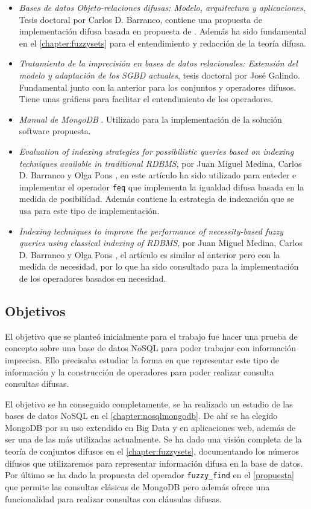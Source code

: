 \begin{itemize}
    \item \textit{Bases de datos Objeto-relaciones difusas: Modelo, arquitectura y aplicaciones}, Tesis doctoral por Carlos D. Barranco, contiene una propuesta de implementación difusa basada en propuesta de \cite{tesismedina}. Además ha sido fundamental en el \autoref{chapter:fuzzysets} para el entendimiento y redacción de la teoría difusa.
    \item \textit{Tratamiento de la imprecisión en bases de datos relacionales: Extensión del modelo y adaptación de los SGBD actuales}, tesis doctoral por José Galindo. Fundamental junto con la anterior para los conjuntos y operadores difusos. Tiene unas gráficas para facilitar el entendimiento de los operadores.
    \item \textit{Manual de MongoDB} \cite{mongodb}. Utilizado para la implementación de la solución software propuesta.
    \item \textit{Evaluation of indexing strategies for possibilistic queries based on indexing techniques available in traditional RDBMS}, por Juan Miguel Medina, Carlos D. Barranco y Olga Pons \cite{indexingstrategies}, en este artículo ha sido utilizado para enteder e implementar el operador \texttt{feq} que implementa la igualdad difusa basada en la medida de posibilidad. Además contiene la estrategia de indexación que se usa para este tipo de implementación.
    \item \textit{Indexing techniques to improve the performance of necessity-based fuzzy queries using classical indexing of RDBMS}, por Juan Miguel Medina, Carlos D. Barranco y Olga Pons \cite{indexingneccesary}, el artículo es similar al anterior pero con la medida de necesidad, por lo que ha sido consultado para la implementación de los operadores basados en necesidad.
\end{itemize}


\subsection{Objetivos}

El objetivo que se planteó inicialmente para el trabajo fue hacer una prueba de concepto sobre una base de datos NoSQL para poder trabajar con información imprecisa. Ello precisaba estudiar la forma en que representar este tipo de información y la construcción de operadores para poder realizar consulta consultas difusas.

El objetivo se ha conseguido completamente, se ha realizado un estudio de las bases de datos NoSQL en el \autoref{chapter:nosqlmongodb}. De ahí se ha elegido MongoDB por su uso extendido en Big Data y en aplicaciones web, además de ser una de las más utilizadas actualmente. Se ha dado una visión completa de la teoría de conjuntos difusos en el \autoref{chapter:fuzzysets}, documentando los números difusos que utilizaremos para representar información difusa en la base de datos. Por último se ha dado la propuesta del operador \texttt{fuzzy\_find} en el \autoref{propuesta} que permite las consultas clásicas de MongoDB pero además ofrece una funcionalidad para realizar consultas con cláusulas difusas.

